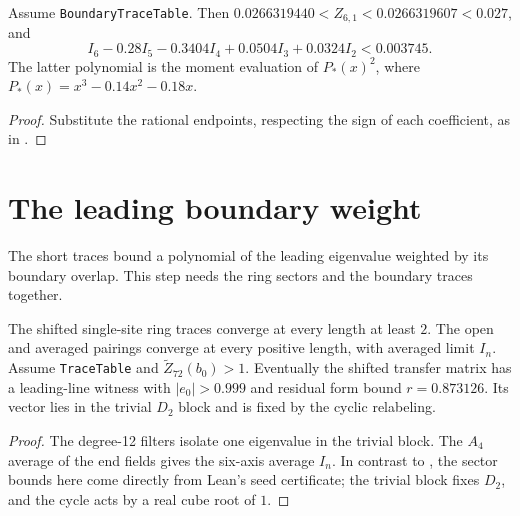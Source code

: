 \begin{lemma}
  \label{lem:boundary-table-moments}
  \leanok
  Assume \texttt{BoundaryTraceTable}. Then
  \(0.0266319440<Z_{6,1}<0.0266319607<0.027\), and
  \[
    I_6-0.28I_5-0.3404I_4+0.0504I_3+0.0324I_2<0.003745.
  \]
  The latter polynomial is the moment evaluation of
  \(P_*(x)^2\), where \(P_*(x)=x^3-0.14x^2-0.18x\).
\end{lemma}
\begin{proof}
  \leanok
  Substitute the rational endpoints, respecting the sign of each coefficient, as in
  \cite[Appendix A, equations (A.19)--(A.20)]{OpenAIBoundary}.
\end{proof}

\section{The leading boundary weight}

The short traces bound a polynomial of the leading eigenvalue weighted by its boundary overlap.
This step needs the ring sectors and the boundary traces together.

\begin{lemma}
  \label{lem:boundary-leading-line}
  \leanok
  The shifted single-site ring traces converge at every length at least \(2\).
  The open and averaged pairings converge at every positive length, with averaged limit \(I_n\).
  Assume \texttt{TraceTable} and \(\widetilde Z_{72}(b_0)>1\).
  Eventually the shifted transfer matrix has a leading-line witness with
  \(|e_0|>0.999\) and residual form bound \(r=0.873126\).
  Its vector lies in the trivial \(D_2\) block and is fixed by the cyclic relabeling.
\end{lemma}
\begin{proof}
  \leanok
  The degree-12 filters isolate one eigenvalue in the trivial block.
  The \(A_4\) average of the end fields gives the six-axis average \(I_n\).
  In contrast to \cite[Proposition 3.4]{OpenAIBoundary}, the sector bounds here come directly
  from Lean's seed certificate; the trivial block fixes \(D_2\), and the cycle acts by a
  real cube root of \(1\).
\end{proof}

